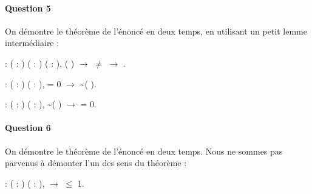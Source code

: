 \documentclass{report}
\begin{document}
\paragraph{Question 5}

On démontre le théorème de l'énoncé en deux temps, en utilisant un petit lemme intermédiaire :

\noindent\begin{coqdoccode}
\coqdocemptyline
\coqdocnoindent
{}  : \coqdockw{\ensuremath{\forall}} ( :  ) ( : ) ( : ),   (  ) \ensuremath{\rightarrow}  \ensuremath{\not=}  \ensuremath{\rightarrow}
\coqdocnoindent
{}  .\coqdoceol
\coqdocemptyline

\coqdocnoindent
{}  : \coqdockw{\ensuremath{\forall}} ( :  ) ( : ),    = 0 \ensuremath{\rightarrow} \~{}(  ).\coqdoceol
\coqdocemptyline

\coqdocnoindent
{}  : \coqdockw{\ensuremath{\forall}} ( :  ) ( : ), \~{}(  ) \ensuremath{\rightarrow}    = 0.\coqdoceol
\coqdocemptyline
\end{coqdoccode}


\paragraph{Question 6}

On démontre le théorème de l'énoncé en deux temps. Nous ne sommes pas parvenus à démonter l'un des sens du théorème :

\noindent\begin{coqdoccode}
\coqdocemptyline
\coqdocnoindent
{}  : \coqdockw{\ensuremath{\forall}} ( :  ) ( : ),   \ensuremath{\rightarrow}    \ensuremath{\le} 1.\coqdoceol
\coqdocemptyline
\end{coqdoccode}
\end{document}
